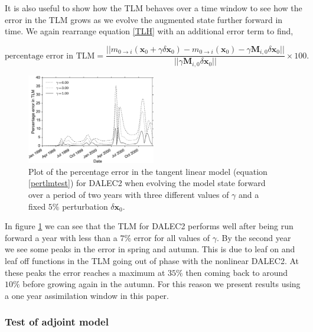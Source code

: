 \documentclass[review]{elsarticle}
\begin{document}
It is also useful to show how the TLM behaves over a time window to see how the error in the TLM grows as we evolve the augmented state further forward in time. We again rearrange equation \eqref{TLH} with an additional error term to find, 
\begin{linenomath}
\begin{equation}
\text{percentage error in TLM} =  \frac{||m_{0\rightarrow i}(\mathbf{x}_0+\gamma \delta\mathbf{x}_0) - m_{0 \rightarrow i}(\mathbf{x}_0) - \gamma\mathbf{M}_{i,0}  \delta\mathbf{x}_0||}{|| \gamma\mathbf{M}_{i,0}  \delta\mathbf{x}_0||} \times 100. \label{pertlmtest}
\end{equation}
\end{linenomath}

\begin{figure}[ht]
    \centering
    \includegraphics[width=0.5\textwidth]{percenterrlinmod.eps}
    \caption{Plot of the percentage error in the tangent linear model (equation \eqref{pertlmtest}) for DALEC2 when evolving the model state forward over a period of two years with three different values of $\gamma$ and a fixed $5\%$ perturbation $\delta \textbf{x}_0$.}
    \label{fig:tlm_error}
\end{figure}

In figure \ref{fig:tlm_error} we can see that the TLM for DALEC2 performs well after being run forward a year with less than a $7\%$ error for all values of $\gamma$. By the second year we see some peaks in the error in spring and autumn. This is due to leaf on and leaf off functions in the TLM going out of phase with the nonlinear DALEC2. At these peaks the error reaches a maximum at $35\%$ then coming back to around $10\%$ before growing again in the autumn. For this reason we present results using a one year assimilation window in this paper. 

\subsubsection{Test of adjoint model} 
\end{document}
